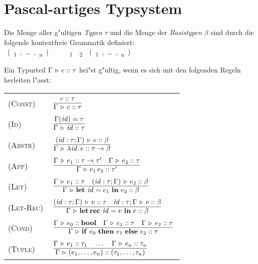 \documentclass[12pt,fleqn,a4paper]{article}
\newcommand{\RN}[1]{\mbox{\textsc{(#1)}}}
\begin{document}
\section{Pascal-artiges Typsystem}

\begin{definition}[Typen]
  Die Menge aller g"ultigen \emph{Typen} $\tau$ und die Menge der \emph{Basistypen} $\beta$ sind durch die folgende
  kontextfreie Grammatik definiert:
  \bgram
  \beta \is \bool \mid \z \mid \unit \mid (\beta_1,\ldots,\beta_n)
  \n
  \tau \is \beta \mid \tau_1 \to \tau_2 \mid (\tau_1,\ldots,\tau_n)
  \egram
\end{definition}

\begin{definition}[Typregeln]
  Ein Typurteil $\Gamma \, \triangleright \, e\mathrel{::}\tau$ hei"st g"ultig, wenn es sich mit den folgenden Regeln herleiten l"asst: \\[5mm]
  \begin{tabular}{ll}
    \RN{Const}   & $\regel{\tj{c}{\tau}}
                          {\Tj{\Gamma}{c}{\tau}}$ \\[3mm]
    \RN{Id}      & $\regel{\Gamma(\id) = \tau}
                          {\Tj{\Gamma}{\id}{\tau}}$ \\[3mm]
    \RN{Abstr}   & $\regel{\Tj{(\id:\tau;\Gamma)}{e}{\beta}}
                          {\Tj{\Gamma}{\abstr{\id}{e}}{\tau \to \beta}}$ \\[3mm]
    \RN{App}     & $\regel{\Tj{\Gamma}{e_1}{\tau \to \tau'} \quad \Tj{\Gamma}{e_2}{\tau}}
                          {\Tj{\Gamma}{\app{e_1}{e_2}}{\tau'}}$ \\[3mm]
    \RN{Let}     & $\regel{\Tj{\Gamma}{e_1}{\tau} \quad \Tj{(\id:\tau;\Gamma)}{e_2}{\beta}}
                          {\Tj{\Gamma}{\bli{\id}{e_1}{e_2}}{\beta}}$ \\[3mm]
    \RN{Let-Rec} & $\regel{\Tj{(\id:\tau;\Gamma)}{v}{\tau} \quad \Tj{\id:\tau;\Gamma}{e}{\beta}}
                          {\Tj{\Gamma}{\blri{\id}{v}{e}}{\beta}}$ \\[3mm]
    \RN{Cond}    & $\regel{\Tj{\Gamma}{e_0}{\bool} \quad \Tj{\Gamma}{e_1}{\tau} \quad \Tj{\Gamma}{e_2}{\tau}}
                          {\Tj{\Gamma}{\bifte{e_0}{e_1}{e_2}}{\tau}}$ \\[3mm]
    \RN{Tuple}   & $\regel{\Tj{\Gamma}{e_1}{\tau_1} \quad \ldots \quad \Tj{\Gamma}{e_n}{\tau_n}}
                          {\Tj{\Gamma}{(e_1,\ldots,e_n)}{(\tau_1,\ldots,\tau_n)}}$ \\[3mm]
  \end{tabular} \\[2mm]

\end{definition}
\end{document}
